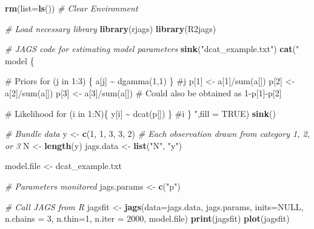 \documentclass[
]{krantz}
\makeatletter
\newenvironment{Shaded}{\begin{snugshade}}{\end{snugshade}}
\newcommand{\AttributeTok}[1]{\textcolor[rgb]{0.27,0.27,0.27}{#1}}
\newcommand{\CommentTok}[1]{\textcolor[rgb]{0.37,0.37,0.37}{\textit{#1}}}
\newcommand{\ConstantTok}[1]{\textcolor[rgb]{0.37,0.37,0.37}{#1}}
\newcommand{\DecValTok}[1]{\textcolor[rgb]{0.06,0.06,0.06}{#1}}
\newcommand{\FunctionTok}[1]{\textcolor[rgb]{0.27,0.27,0.27}{\textbf{#1}}}
\newcommand{\NormalTok}[1]{#1}
\newcommand{\OtherTok}[1]{\textcolor[rgb]{0.37,0.37,0.37}{#1}}
\newcommand{\StringTok}[1]{\textcolor[rgb]{0.5,0.5,0.5}{#1}}
\newenvironment{kframe}{%
\medskip{}
\setlength{\fboxsep}{.8em}
 \def\at@end@of@kframe{}%
 \ifinner\ifhmode%
  \def\at@end@of@kframe{\end{minipage}}%
  \begin{minipage}{\columnwidth}%
 \fi\fi%
 \def\FrameCommand##1{\hskip\@totalleftmargin \hskip-\fboxsep
 \colorbox{shadecolor}{##1}\hskip-\fboxsep
     \hskip-\linewidth \hskip-\@totalleftmargin \hskip\columnwidth}%
 \MakeFramed {\advance\hsize-\width
   \@totalleftmargin\z@ \linewidth\hsize
   \@setminipage}}%
 {\par\unskip\endMakeFramed%
 \at@end@of@kframe}
\renewenvironment{Shaded}{\begin{kframe}}{\end{kframe}}
\makeatother
\begin{document}
\begin{Shaded}
\begin{Highlighting}[]
\FunctionTok{rm}\NormalTok{(}\AttributeTok{list=}\FunctionTok{ls}\NormalTok{()) }\CommentTok{\# Clear Environment}

\CommentTok{\# Load necessary library}
\FunctionTok{library}\NormalTok{(rjags)}
\FunctionTok{library}\NormalTok{(R2jags)}

\CommentTok{\# JAGS code for estimating model parameters}
\FunctionTok{sink}\NormalTok{(}\StringTok{"dcat\_example.txt"}\NormalTok{)}
\FunctionTok{cat}\NormalTok{(}\StringTok{"}
\StringTok{model \{}

\StringTok{\# Priors}
\StringTok{    for (j in 1:3) \{}
\StringTok{         a[j] \textasciitilde{} dgamma(1,1)}
\StringTok{         \} \#j}
\StringTok{     p[1] \textless{}{-} a[1]/sum(a[])}
\StringTok{     p[2] \textless{}{-} a[2]/sum(a[])}
\StringTok{     p[3] \textless{}{-} a[3]/sum(a[]) \# Could also be obtained as 1{-}p[1]{-}p[2]}

\StringTok{\# Likelihood}
\StringTok{  for (i in 1:N)\{}
\StringTok{    y[i] \textasciitilde{} dcat(p[])}
\StringTok{  \} \#i}
\StringTok{\}}
\StringTok{    "}\NormalTok{,}\AttributeTok{fill =} \ConstantTok{TRUE}\NormalTok{)}
\FunctionTok{sink}\NormalTok{()}

\CommentTok{\# Bundle data}
\NormalTok{y }\OtherTok{\textless{}{-}} \FunctionTok{c}\NormalTok{(}\DecValTok{1}\NormalTok{, }\DecValTok{1}\NormalTok{, }\DecValTok{3}\NormalTok{, }\DecValTok{3}\NormalTok{, }\DecValTok{2}\NormalTok{) }\CommentTok{\# Each observation drawn from category 1, 2, or 3}
\NormalTok{N }\OtherTok{\textless{}{-}} \FunctionTok{length}\NormalTok{(y)}
\NormalTok{jags.data }\OtherTok{\textless{}{-}} \FunctionTok{list}\NormalTok{(}\StringTok{"N"}\NormalTok{, }\StringTok{"y"}\NormalTok{)}

\NormalTok{model.file }\OtherTok{\textless{}{-}} \StringTok{\textquotesingle{}dcat\_example.txt\textquotesingle{}}

\CommentTok{\# Parameters monitored}
\NormalTok{jags.params }\OtherTok{\textless{}{-}} \FunctionTok{c}\NormalTok{(}\StringTok{"p"}\NormalTok{)}

\CommentTok{\# Call JAGS from R}
\NormalTok{jagsfit }\OtherTok{\textless{}{-}} \FunctionTok{jags}\NormalTok{(}\AttributeTok{data=}\NormalTok{jags.data, jags.params, }\AttributeTok{inits=}\ConstantTok{NULL}\NormalTok{,}
                \AttributeTok{n.chains =} \DecValTok{3}\NormalTok{, }\AttributeTok{n.thin=}\DecValTok{1}\NormalTok{, }\AttributeTok{n.iter =} \DecValTok{2000}\NormalTok{,}
\NormalTok{                model.file)}
\FunctionTok{print}\NormalTok{(jagsfit)}
\FunctionTok{plot}\NormalTok{(jagsfit)}
\end{Highlighting}
\end{Shaded}
\end{document}
